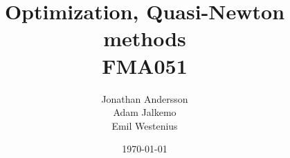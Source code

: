 \documentclass{article}
\begin{document}
\title{Optimization, Quasi-Newton methods\\  FMA051} %

\author{Jonathan Andersson \\ Adam Jalkemo \\ Emil Westenius} %

\date{\today} %


\maketitle %
\pagebreak


















%
%
%
%
%
%
%
\end{document}

